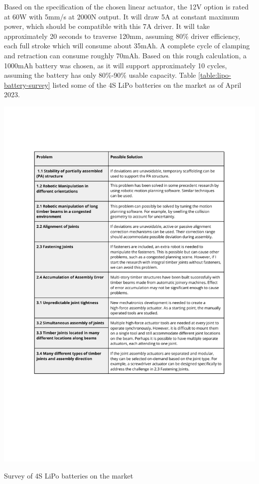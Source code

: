 Based on the specification of the chosen linear actuator, the 12V option is rated at 60W with 5mm/s at 2000N output. It will draw 5A at constant maximum power, which should be compatible with this 7A driver. It will take approximately 20 seconds to traverse 120mm, assuming 80\% driver efficiency, each full stroke which will consume about 35mAh. A complete cycle of clamping and retraction can consume roughly 70mAh. Based on this rough calculation, a 1000mAh battery was chosen, as it will support approximately 10 cycles, assuming the battery has only 80\%-90\% usable capacity.   
Table \ref{table:lipo-battery-survey} listed some of the 4S LiPo batteries on the market as of April 2023. 

\begin{table}[]
    \includegraphics[page=6, trim=25.4mm 210mm 25.4mm 33mm, clip, width=\textwidth]{tables/Tables in Chapter 4.pdf}
    \caption{Survey of 4S LiPo batteries on the market}
    \label{table:lipo-battery-survey}
\end{table}

